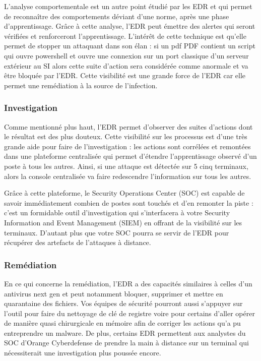 L’analyse comportementale est un autre point étudié par les EDR et qui permet de reconnaître des comportements déviant d’une norme, après une phase d’apprentissage. Grâce à cette analyse, l’EDR peut émettre des alertes qui seront vérifiées et renforceront l’apprentissage. L’intérêt de cette technique est qu’elle permet de stopper un attaquant dans son élan : si un pdf PDF contient un script qui ouvre powershell et ouvre une connexion sur un port classique d’un serveur extérieur au SI alors cette suite d’action sera considérée comme anormale et va être bloquée par l’EDR. Cette visibilité est une grande force de l’EDR car elle permet une remédiation à la source de l’infection.


\subsubsection{Investigation}

Comme mentionné plus haut, l’EDR permet d’observer des suites d’actions dont le résultat est des plus douteux. Cette visibilité sur les processus est d’une très grande aide pour faire de l’investigation : les actions sont corrélées et remontées dans une plateforme centralisée qui permet d’étendre l’apprentissage observé d’un poste à tous les autres. Ainsi, si une attaque est détectée sur 5 cinq terminaux, alors la console centralisée va faire redescendre l’information sur tous les autres.

Grâce à cette plateforme, le Security Operations Center (SOC) est capable de savoir immédiatement combien de postes sont touchés et d’en remonter la piste : c’est un formidable outil d’investigation qui s’interfacera à votre Security Information and Event Management (SIEM) en offrant de la visibilité sur les terminaux. D’autant plus que votre SOC pourra se servir de l’EDR pour récupérer des artefacts de l’attaques à distance.

\subsubsection{Remédiation}

En ce qui concerne la remédiation, l’EDR a des capacités similaires à celles d’un antivirus next gen et peut notamment bloquer, supprimer et mettre en quarantaine des fichiers. Vos équipes de sécurité pourront aussi s’appuyer sur l’outil pour faire du nettoyage de clé de registre voire pour certains d’aller opérer de manière quasi chirurgicale en mémoire afin de corriger les actions qu’a pu entreprendre un malware.  De plus, certains EDR permettent aux analystes du SOC d’Orange Cyberdefense de prendre la main à distance sur un terminal qui nécessiterait une investigation plus poussée encore.


